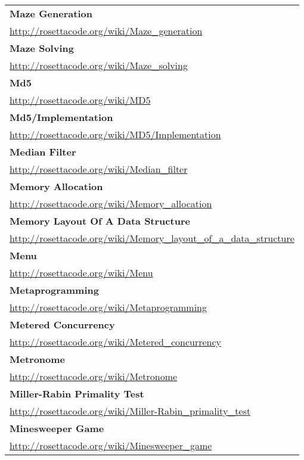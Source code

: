 \begin{longtable}{l}
\textbf{Maze Generation } \\ \href{http://rosettacode.org/wiki/Maze\_generation}{http://rosettacode.org/wiki/Maze\_generation} \\
\textbf{Maze Solving } \\ \href{http://rosettacode.org/wiki/Maze\_solving}{http://rosettacode.org/wiki/Maze\_solving} \\
\textbf{
Md5 } \\ \href{http://rosettacode.org/wiki/MD5}{http://rosettacode.org/wiki/MD5} \\
\textbf{Md5/Implementation } \\ \href{http://rosettacode.org/wiki/MD5/Implementation}{http://rosettacode.org/wiki/MD5/Implementation} \\
\textbf{Median Filter } \\ \href{http://rosettacode.org/wiki/Median\_filter}{http://rosettacode.org/wiki/Median\_filter} \\
\textbf{Memory Allocation } \\ \href{http://rosettacode.org/wiki/Memory\_allocation}{http://rosettacode.org/wiki/Memory\_allocation} \\
\textbf{
Memory Layout Of A Data Structure } \\ \href{http://rosettacode.org/wiki/Memory\_layout\_of\_a\_data\_structure}{http://rosettacode.org/wiki/Memory\_layout\_of\_a\_data\_structure} \\
\textbf{Menu } \\ \href{http://rosettacode.org/wiki/Menu}{http://rosettacode.org/wiki/Menu} \\
\textbf{Metaprogramming } \\ \href{http://rosettacode.org/wiki/Metaprogramming}{http://rosettacode.org/wiki/Metaprogramming} \\
\textbf{
Metered Concurrency } \\ \href{http://rosettacode.org/wiki/Metered\_concurrency}{http://rosettacode.org/wiki/Metered\_concurrency} \\
\textbf{Metronome } \\ \href{http://rosettacode.org/wiki/Metronome}{http://rosettacode.org/wiki/Metronome} \\
\textbf{Miller-Rabin Primality Test } \\ \href{http://rosettacode.org/wiki/Miller-Rabin\_primality\_test}{http://rosettacode.org/wiki/Miller-Rabin\_primality\_test} \\
\textbf{
Minesweeper Game } \\ \href{http://rosettacode.org/wiki/Minesweeper\_game}{http://rosettacode.org/wiki/Minesweeper\_game} \\

\end{longtable}
